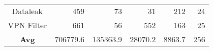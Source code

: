 \begin{table}[t]
{\begin{tabular}{crrrrr}
Dataleak                   & 459                              & 73                                    & 31                                       & 212                                 & 24                                         \\ 
VPN Filter                  & 661                              & 56                                    & 552                                      & 163                                 & 25                                         \\ 
\textbf{Avg}               & 706779.6                         & 135363.9                              & 28070.2                                  & 8863.7                              & 256                                      \\ \hline
\end{tabular}
}
\label{tab:rq1}
\end{table}